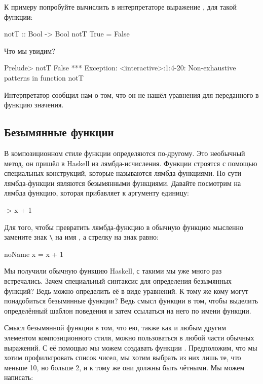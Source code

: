 К примеру попробуйте вычислить в интерпретаторе выражение ,
для такой функции:

\begin{code}
notT :: Bool -> Bool
notT True = False
\end{code}

Что мы увидим?

\begin{code}
Prelude> notT False
*** Exception: <interactive>:1:4-20: Non-exhaustive patterns in function notT
\end{code}

Интерпретатор сообщил нам о том, что он не нашёл уравнения
для переданного в функцию значения. 

\subsection{Безымянные функции}

В композиционном стиле функции определяются по-другому.
Это необычный метод, он пришёл в Haskell из лямбда-исчисления.
Функции строятся с помощью специальных конструкций, которые
называются лямбда-функциями. По сути лямбда-функции являются
безымянными функциями. Давайте посмотрим на лямбда функцию,
которая прибавляет к аргументу единицу:

\begin{code}
\x -> x + 1
\end{code}

Для того, чтобы превратить лямбда-функцию в обычную функцию
мысленно замените знак \verb!\! на имя ,
а стрелку на знак равно:

\begin{code}
noName x = x + 1
\end{code}

Мы получили обычную функцию Haskell, с такими мы уже много
раз встречались. Зачем специальный синтаксис для определения
безымянных функций? Ведь можно определить её в виде уравнений. 
К тому же кому могут понадобиться безымянные функции? 
Ведь смысл функции в том, чтобы выделить определённый 
шаблон поведения и затем ссылаться на него по имени функции. 

Смысл безымянной функции в том, что ею, также как и любым
другим элементом композиционного стиля, можно пользоваться
в любой части обычных выражений. С её помощью мы можем 
создавать функции . Предположим, что мы
хотим профильтровать список чисел, мы хотим выбрать из них лишь
те, что меньше 10, но больше 2, и к тому же они должны быть чётными. 
Мы можем написать:

